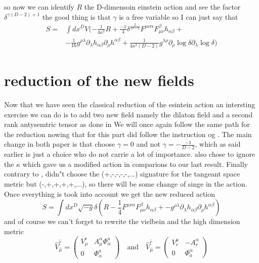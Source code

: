\documentclass{article}
\begin{document}
so now we can identify $R$ the D-dimensoin einstein action and see the factor $\delta^{\gamma(D-2)+1}$ the good thing is that $\gamma$ is a free variable so I can just say that 
\begin{equation}
    \boxed{
    \begin{aligned}
    S = &\int d x^D V(
    -\frac{1}{4 \kappa^2}R +\frac{-1}{4}\delta^{\frac{2}{D-2} }F^{\mu \nu \alpha}F^{\beta}_{\mu  \nu}h_{\alpha \beta}+\\
    &-\frac{1}{16}  g^{\rho \lambda} \partial_\lambda h_{\alpha \beta}\partial_\rho h^{\alpha \beta}
    +\frac{1}{4 \kappa^2 (D-2)}g^{\lambda \rho}\partial_{\rho}\log{\delta}\partial_{\lambda}\log{\delta} 
    )
\end{aligned}}
\end{equation}

\section{reduction of the new fields}
Now that we have seen the classical reduction of the esintein action an intersting exercise we can do is to add two new field namely the dilaton field and a second rank antysemtric tensor as done in \cite{maharana1993noncompact}
We will once again follow the same path for the reduction nowing that for this part \cite{maharana1993noncompact} did follow the instruction og \cite{scherk1979get}. The main change in both paper is that \cite{maharana1993noncompact}
choose $\gamma = 0 $ and  not $\gamma = - \frac{-1}{D-2}$, which as said earlier is just a choice who do not carrie a lot of importance. \cite{maharana1993noncompact} also chose to ignore the $\kappa$ which gave us a modified action in comparions to our last result. Finally contrary to \cite{scherk1979get}
,\cite{maharana1993noncompact} didn"t choose the (+,-,-,-,-,...) signature for the tangeant space metric but (-,+,+,+,+,...), so there will be some change of singe in the action. 
Once everything is took into account we get the new reduced action
\begin{equation}
    \boxed{
    S = \int d x^D \sqrt{-g}\delta (
    R -\frac{1}{4}F^{\mu \nu \alpha}F^{\beta}_{\mu  \nu}h_{\alpha \beta}+
    - g^{\rho \lambda} \partial_\lambda h_{\alpha \beta}\partial_\rho h^{\alpha \beta} 
    )}
\end{equation}
and of course we can't forget to rewrite the vielbein and the high dimension metric
\begin{equation} \label{eq:12}
    \hat V^{\hat r}_{\hat \mu} = \begin{pmatrix} 
        V^r _\mu &   A^{\alpha }_\mu \Phi^a_\alpha \\ 0 & \Phi^a_\alpha
    \end{pmatrix} \quad \text{and} \quad \hat V^{\hat r}_{\hat \mu} = \begin{pmatrix} 
         V^\mu_r &  - A^{\alpha }_r \\ 0 & \Phi^\alpha_a
    \end{pmatrix}
\end{equation}
\end{document}
